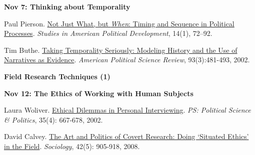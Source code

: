 \documentclass[letterpaper]{article}
\renewenvironment{itemize}{
  \begin{list}{}{
    \setlength{\leftmargin}{1.5em}
  }
}{
  \end{list}
}
\begin{document}
\begin{enumerate}
		\begin{itemize}
		\item {\bf Nov 7: Thinking about Temporality}
			\begin{itemize}
				\item[$\bullet$] Paul Pierson. \href{https://www.cambridge.org/core/services/aop-cambridge-core/content/view/S0898588X00003011}{Not Just What, but \emph{When}: Timing and Sequence in Political Processes}. \emph{Studies in American Political Development}, 14(1), 72–92.
				\item[$\bullet$] Tim Buthe. \href{https://people.duke.edu/~buthe/downloads/buthe_apsr_sep2002.pdf}{Taking Temporality Seriously: Modeling History and the Use of Narratives as Evidence}. \emph{American Political Science Review}, 93(3):481-493, 2002.
			\end{itemize}
		\end{itemize}



%		


\item {\bf Field Research Techniques (1)}
		
		\begin{itemize}
		\item {\bf Nov 12: The Ethics of Working with Human Subjects}
			\begin{itemize}
				\item[$\bullet$] Laura Woliver. \href{https://dornsife.usc.edu/assets/sites/298/docs/interviewing_techniques_ethical_dilemmas.pdf}{Ethical Dilemmas in Personal Interviewing}. \emph{PS: Political Science \& Politics}, 35(4): 667-678, 2002.
				\item[$\bullet$] David Calvey. \href{http://journals.sagepub.com/doi/pdf/10.1177/0038038508094569}{The Art and Politics of Covert Research: Doing `Situated Ethics' in the Field}. \emph{Sociology}, 42(5): 905-918, 2008. 
			\end{itemize}
		\end{itemize}



\end{enumerate}
\end{document}
